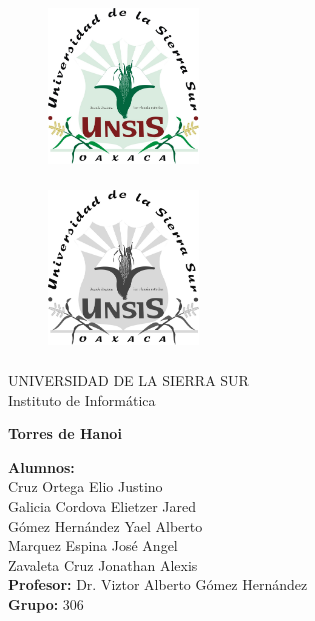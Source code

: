 \documentclass[letterpaper,12pt]{extarticle}%
\begin{document}
    \begin{titlepage}
		\begin{figure}[ht]
				\includegraphics[width=4cm]{imag//logColor.jpg}
				\label{escudoFI}
		   \endminipage

				\includegraphics[height = 4.5cm ,width=4cm]{imag//logBN.jpg} 
				\label{EscuoUNAM}
			\endminipage
		\end{figure}
		
		\vspace{0.5cm}
		
		\begin{center}
			\LARGE UNIVERSIDAD DE LA SIERRA SUR \\
			\vspace{0.3cm}
			\LARGE Instituto de Informática
			
			\vspace{.7cm} {\LARGE  \textbf{Torres de Hanoi} \\}

			

			\vspace{.5cm}
			\begin{center}

				\LARGE{ \textbf{Alumnos:}}\\%
        		\LARGE{Cruz Ortega Elio Justino}\\
				\LARGE{Galicia Cordova Elietzer Jared}\\%
				\LARGE{Gómez Hernández Yael Alberto}\\
				\LARGE{Marquez Espina José Angel}\\
				\LARGE{Zavaleta Cruz Jonathan Alexis}\\
				\vspace{0.5cm}
				\textbf{Profesor:}  Dr. Viztor Alberto Gómez Hernández \\
				\vspace{0.5cm}
				\textbf{Grupo:}  306
				

\end{center}
\end{center}
\end{titlepage}
\end{document}
